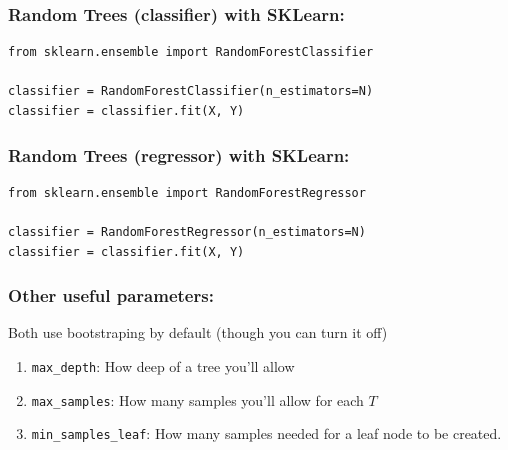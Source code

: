 \documentclass{beamer}
\begin{document}
  \begin{frame}[fragile]
    \frametitle{Random Trees (classifier) with SKLearn:}
  
        \centering
    {\color{dark-gray}
        \begin{BVerbatim}
from sklearn.ensemble import RandomForestClassifier

classifier = RandomForestClassifier(n_estimators=N)
classifier = classifier.fit(X, Y)
        \end{BVerbatim}
  }

  \end{frame}

  \begin{frame}[fragile]
    \frametitle{Random Trees (regressor) with SKLearn:}
  
        \centering
    {\color{dark-gray}
        \begin{BVerbatim}
from sklearn.ensemble import RandomForestRegressor

classifier = RandomForestRegressor(n_estimators=N)
classifier = classifier.fit(X, Y)
        \end{BVerbatim}
  }

  \end{frame}

  \begin{frame}[fragile]
    \frametitle{Other useful parameters:}

    Both use bootstraping by default (though you can turn it off)

      \begin{enumerate}
        \item<2 -> \verb`max_depth`: How deep of a tree you'll allow
        \item<3 -> \verb`max_samples`: How many samples you'll allow for each $T$
        \item<4 -> \verb`min_samples_leaf`: How many samples needed for a leaf node to be created.
      \end{enumerate}
  \end{frame}



\end{document}
